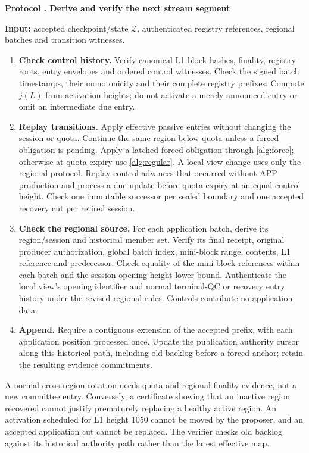 \documentclass[11pt,a4paper,onecolumn]{article}
\newcommand{\changed}[1]{{\color{red}#1}}
\newcounter{protocol}
\newenvironment{protocol}[2]{\refstepcounter{protocol}\label{#1}
\begin{mdframed}[nobreak=true,linewidth=.6pt,skipabove=9pt,skipbelow=9pt,
innertopmargin=7pt,innerbottommargin=7pt]\small
\noindent\textbf{Protocol \theprotocol. #2}\par\smallskip}{\end{mdframed}}
\begin{document}
\begin{protocol}{alg:derive}{Derive and verify the next stream segment}
\textbf{Input:} accepted checkpoint/state $\mathcal Z$, authenticated
registry references, regional batches and transition witnesses.
\begin{enumerate}[label=\textbf{L\arabic*.}]
\item \textbf{Check control history.} Verify canonical L1 block hashes,
finality, registry roots, entry envelopes and ordered control witnesses.
Check the signed batch timestamps, their monotonicity and their complete
registry prefixes. Compute $j(L)$ from activation heights; do not activate
a merely announced entry or omit an intermediate due entry.
\item \textbf{Replay transitions.} Apply effective passive entries without changing
the session or quota. Continue the same region below quota unless a forced
obligation is pending. Apply a latched forced obligation through
\cref{alg:force}; otherwise at quota expiry use \cref{alg:regular}. A local view change uses only
the regional protocol. Replay control advances that occurred without
APP production and process a due update before quota expiry at an equal
control height. Check one immutable successor per sealed boundary and one
accepted recovery cut per retired session.
\item \textbf{Check the regional source.} For each application batch,
derive its region/session and historical member set. Verify its final
receipt, original producer authorization, global batch index, mini-block
range, contents, L1 reference and predecessor. Check equality of the
mini-block references within each batch and the session opening-height
lower bound. \changed{Authenticate the local view's opening identifier and
normal terminal-QC or recovery entry history under the revised regional rules.}
Controls contribute no application data.
\item \textbf{Append.} Require a contiguous extension of the accepted
prefix, with each application position processed once. Update the
publication authority cursor along this historical path, including old
backlog before a forced anchor; retain the resulting evidence commitments.
\end{enumerate}
\end{protocol}
A normal cross-region rotation needs quota and regional-finality evidence, not a new
committee entry. Conversely, a certificate showing that an inactive region
recovered cannot justify prematurely replacing a healthy active region.
An activation scheduled for L1 height $1050$ cannot be moved by the
proposer, and an accepted application cut cannot be replaced. The verifier
checks old backlog against its historical authority path rather than the
latest effective map.
\end{document}
